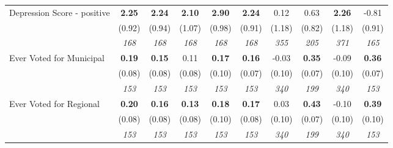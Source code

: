 \begin{tabular}{l c c c c c c c c c}
Depression Score - positive & \textbf{ 2.25 } & \textbf{ 2.24 } & \textbf{ 2.10 } & \textbf{2.90} & \textbf{2.24} & 0.12 & 0.63 & \textbf{ 2.26 } & -0.81 \\
& (0.92) & (0.94) & (1.07) & (0.98) & (0.91) & (1.18) & (0.82) & (1.18) & (0.91) \\
& \textit{ 168 } & \textit{ 168 } & \textit{ 168 } & \textit{ 168 } & \textit{ 168 } & \textit{ 355 } & \textit{ 205 } & \textit{ 371 } & \textit{ 165 } \\
Ever Voted for Municipal & \textbf{ 0.19 } & \textbf{ 0.15 } & 0.11 & \textbf{0.17} & \textbf{0.16} & -0.03 & \textbf{0.35} & -0.09 & \textbf{0.36} \\
& (0.08) & (0.08) & (0.08) & (0.10) & (0.07) & (0.10) & (0.07) & (0.10) & (0.07) \\
& \textit{ 153 } & \textit{ 153 } & \textit{ 153 } & \textit{ 153 } & \textit{ 153 } & \textit{ 340 } & \textit{ 199 } & \textit{ 340 } & \textit{ 153 } \\
Ever Voted for Regional & \textbf{ 0.20 } & \textbf{ 0.16 } & \textbf{ 0.13 } & \textbf{0.18} & \textbf{0.17} & 0.03 & \textbf{0.43} & -0.10 & \textbf{0.39} \\
& (0.08) & (0.08) & (0.08) & (0.10) & (0.08) & (0.10) & (0.07) & (0.10) & (0.10) \\
& \textit{ 153 } & \textit{ 153 } & \textit{ 153 } & \textit{ 153 } & \textit{ 153 } & \textit{ 340 } & \textit{ 199 } & \textit{ 340 } & \textit{ 153 } \\
\bottomrule
\end{tabular}
